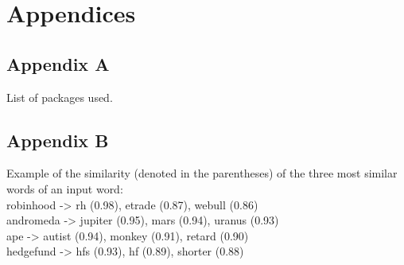 \documentclass[11pt, a4paper]{article}
\begin{document}
\newpage

\pagebreak
\section{Appendices}

\subsection{Appendix A}
\label{appendix:A}
List of packages used.

\subsection{Appendix B}
\label{appendix:B}

Example of the similarity (denoted in the parentheses) of the three most similar words of an input word: \\
robinhood -> rh (0.98), etrade (0.87), webull (0.86) \\
andromeda -> jupiter (0.95), mars (0.94), uranus (0.93) \\
ape -> autist (0.94), monkey (0.91), retard (0.90) \\
hedgefund -> hfs (0.93), hf (0.89), shorter (0.88) \\

\newpage
\end{document}
